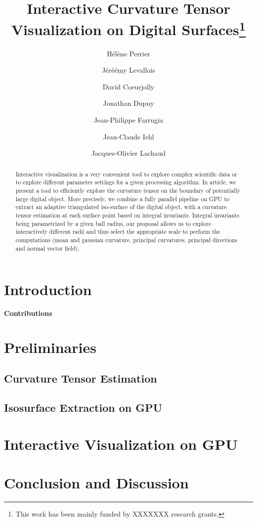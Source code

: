 \documentclass{llncs}
\title{Interactive Curvature Tensor  Visualization on Digital Surfaces\thanks{This work has been mainly funded by
   XXXXXXX  research
    grants.}}
\author{H\'el\`ene Perrier\inst{1}\and J\'eré\'emy Levallois\inst{1}\and  David Coeurjolly\inst{1}\and  Jonathan
  Dupuy\inst{1}\inst{2}\and   Jean-Philippe Farrugia\inst{1}\and Jean-Claude Iehl\inst{1}\and Jacques-Olivier Lachaud\inst{3} }
\institute{ Universit\'e de Lyon, CNRS\\
   INSA-Lyon, LIRIS, UMR5205, F-69621, France
   \and
 Universit\'ee de Montr\'eeal\\
LIGUM, Dept. I.R.O., Canada\\
\and
Universit\'e de Savoie, CNRS\\
LAMA, UMR5127, F-73776, France\\
}
\begin{document}
\maketitle


\begin{abstract}\sloppy
  Interactive visualization is a very convenient tool to explore
  complex scientific data or to explore different parameter settings
  for a given processing algorithm. In article, we present a tool to
  efficiently explore the curvature tensor on the boundary of
  potentially large digital object. More precisely, we combine a fully
  parallel pipeline on GPU to extract an adaptive triangulated
  iso-surface of the digital object, with a curvature tensor
  estimation at each surface point based on integral invariants. Integral
  invariants being parametrized by a given ball radius, our proposal
  allows us to explore interactively different radii and thus select
  the appropriate scale to perform the computations (mean and gaussian
  curvature, principal curvatures, principal directions and normal
  vector field).

  
\end{abstract}

\section{Introduction}
\label{sec:introduction}



\textbf{Contributions}


\section{Preliminaries}
\label{sec:preliminaries}

\subsection{Curvature Tensor Estimation}
\label{sec:curv-tens-estim}

\subsection{Isosurface Extraction on GPU}
\label{sec:isos-extr-gpu}

\section{Interactive Visualization on GPU}
\label{sec:inter-visu-gpu}

\section{Conclusion and Discussion}
\label{sec:discussion}





\end{document}
